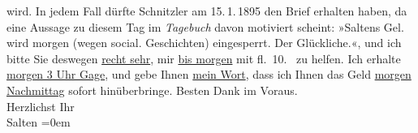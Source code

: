 \begin{ledgroupsized}[t]{13cm}
{{{                  wird. In jedem Fall dürfte Schnitzler am
                     15. 1. 1895 den
                  Brief erhalten haben, da eine Aussage zu diesem Tag im \emph{Tagebuch} davon motiviert scheint: »Saltens Gel. wird morgen (wegen social.
                     Geschichten) eingesperrt. Der Glückliche.«}}}\label{K_L03148-11h}, und ich bitte Sie
               deswegen \uline{recht sehr}, mir \uline{bis morgen} mit fl. 10.~ zu helfen. Ich erhalte \uline{morgen 3 Uhr Gage}, und gebe Ihnen {\pb}\uline{mein Wort}, dass ich Ihnen das Geld \uline{morgen Nachmittag} sofort hinüberbringe. \pend
           \pstart
           Besten Dank im Voraus. {\\[\baselineskip]}Herzlichst Ihr {\\[\baselineskip]}\spacefill\mbox{Salten}\pend
           \leftskip=0em{}
         
         \endnumbering{}\end{ledgroupsized}\begin{anhang}\end{anhang}\newcommand{\dateiname}{L03148}\newcommand{\titel}{Felix Salten an Arthur Schnitzler, [14?. 1. 1895]}\newcommand{\editorInnen}{Martin Anton Müller und Laura Untner}
      
